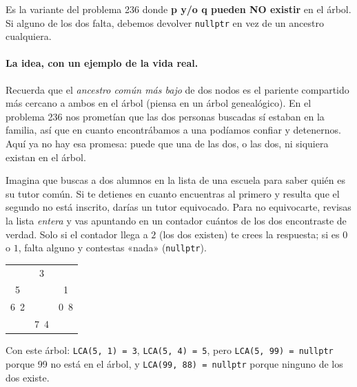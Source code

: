 
Es la variante del problema 236 donde \textbf{p y/o q pueden NO existir} en
el árbol. Si alguno de los dos falta, debemos devolver \texttt{nullptr} en
vez de un ancestro cualquiera.

\paragraph{La idea, con un ejemplo de la vida real.} Recuerda que el
\emph{ancestro común más bajo} de dos nodos es el pariente compartido más
cercano a ambos en el árbol (piensa en un árbol genealógico). En el problema 236
nos prometían que las dos personas buscadas sí estaban en la familia, así que en
cuanto encontrábamos a una podíamos confiar y detenernos. Aquí ya no hay esa
promesa: puede que una de las dos, o las dos, ni siquiera existan en el árbol.

Imagina que buscas a dos alumnos en la lista de una escuela para saber quién es
su tutor común. Si te detienes en cuanto encuentras al primero y resulta que el
segundo no está inscrito, darías un tutor equivocado. Para no equivocarte,
revisas la lista \emph{entera} y vas apuntando en un contador cuántos de los dos
encontraste de verdad. Solo si el contador llega a $2$ (los dos existen) te
crees la respuesta; si es $0$ o $1$, falta alguno y contestas «nada»
(\texttt{nullptr}).

\begin{center}
\ttfamily
\begin{tabular}{ccc}
     & 3 &     \\
  5  &   &  1  \\
6\ 2 &   & 0\ 8\\
     &7\ 4&    \\
\end{tabular}
\end{center}

\noindent Con este árbol: \texttt{LCA(5, 1) = 3}, \texttt{LCA(5, 4) = 5},
pero \texttt{LCA(5, 99) = nullptr} porque 99 no está en el árbol, y
\texttt{LCA(99, 88) = nullptr} porque ninguno de los dos existe.

